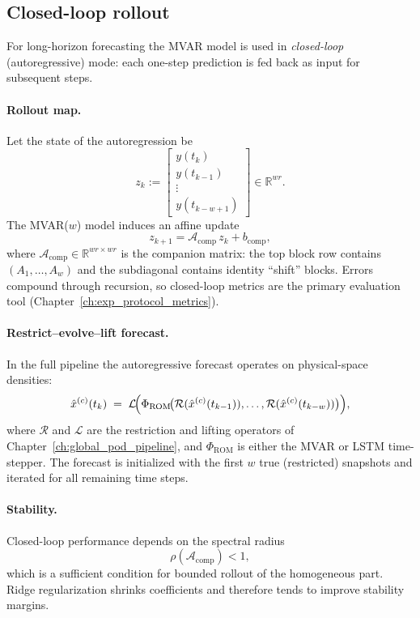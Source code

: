 \documentclass{report}
\theoremstyle{plain}
\theoremstyle{remark}
\numberwithin{equation}{section}              %
\begin{document}
\subsection{Closed-loop rollout}\label{subsec:mvar_rollout}
For long-horizon forecasting the MVAR model is used in \emph{closed-loop}
(autoregressive) mode: each one-step prediction is fed back as input for
subsequent steps.

\paragraph{Rollout map.}
Let the state of the autoregression be
\[
  z_k :=
  \begin{bmatrix}
    y(t_k)\\ y(t_{k-1})\\ \vdots\\ y(t_{k-w+1})
  \end{bmatrix}\in\mathbb{R}^{wr}.
\]
The MVAR($w$) model induces an affine update
\begin{equation}\label{eq:companion_update}
  z_{k+1} = \mathcal{A}_{\mathrm{comp}}\, z_k + b_{\mathrm{comp}},
\end{equation}
where $\mathcal{A}_{\mathrm{comp}}\in\mathbb{R}^{wr\times wr}$ is the
companion matrix: the top block row contains $(A_1,\dots,A_w)$ and the
subdiagonal contains identity ``shift'' blocks.
Errors compound through recursion, so closed-loop metrics are the primary
evaluation tool (Chapter~\ref{ch:exp_protocol_metrics}).

\paragraph{Restrict--evolve--lift forecast.}
In the full pipeline the autoregressive forecast operates on physical-space
densities:
\begin{equation}\label{eq:closed_loop_forecast}
  \hat x^{(c)}(t_k) \;=\;
  \mathcal{L}\!\Bigl(
    \Phi_{\mathrm{ROM}}\!\bigl(
      \mathcal{R}(\hat x^{(c)}(t_{k-1})),\dots,
      \mathcal{R}(\hat x^{(c)}(t_{k-w}))
    \bigr)
  \Bigr),
\end{equation}
where $\mathcal{R}$ and $\mathcal{L}$ are the restriction and lifting
operators of Chapter~\ref{ch:global_pod_pipeline}, and $\Phi_{\mathrm{ROM}}$ is
either the MVAR or LSTM time-stepper.
The forecast is initialized with the first $w$ true (restricted) snapshots
and iterated for all remaining time steps.

\paragraph{Stability.}
Closed-loop performance depends on the spectral radius
\[
  \rho(\mathcal{A}_{\mathrm{comp}}) < 1,
\]
which is a sufficient condition for bounded rollout of the homogeneous part.
Ridge regularization shrinks coefficients and therefore tends to improve
stability margins.
\end{document}
